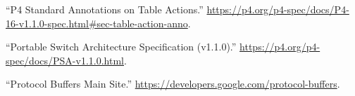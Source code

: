 \documentclass[11pt]{article}
\begin{document}
{{\begin{thebibliography}{35}
\mdbibitemlabel{{}[17]}\textquotedblleft{}P4 Standard Annotations on Table Actions.\textquotedblright{} \href{https://p4.org/p4-spec/docs/P4-16-v1.1.0-spec.html\%23sec-table-action-anno}{{\ttfamily https://\hspace{0pt}p4.\hspace{0pt}org/\hspace{0pt}p4-\hspace{0pt}spec/\hspace{0pt}docs/\hspace{0pt}P4-\hspace{0pt}16-\hspace{0pt}v1.\hspace{0pt}1.\hspace{0pt}0-\hspace{0pt}spec.\hspace{0pt}html\#\hspace{0pt}sec-\hspace{0pt}table-\hspace{0pt}action-\hspace{0pt}anno}}.\label{p4actionannotations}%

\mdbibitemlabel{{}[18]}\textquotedblleft{}Portable Switch Architecture Specification (v1.1.0).\textquotedblright{} \href{https://p4.org/p4-spec/docs/PSA-v1.1.0.html}{{\ttfamily https://\hspace{0pt}p4.\hspace{0pt}org/\hspace{0pt}p4-\hspace{0pt}spec/\hspace{0pt}docs/\hspace{0pt}PSA-\hspace{0pt}v1.\hspace{0pt}1.\hspace{0pt}0.\hspace{0pt}html}}.\label{psa}%

\mdbibitemlabel{{}[19]}\textquotedblleft{}Protocol Buffers Main Site.\textquotedblright{} \href{https://developers.google.com/protocol-buffers}{{\ttfamily https://\hspace{0pt}developers.\hspace{0pt}google.\hspace{0pt}com/\hspace{0pt}protocol-\hspace{0pt}buffers}}.\label{proto}%


\end{thebibliography}}}
\end{document}
